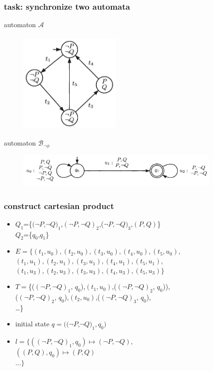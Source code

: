\documentclass{beamer}
\begin{document}
    \begin{frame}
        \frametitle{task: synchronize two automata}
        automaton $\mathcal{A}$\\
        \begin{figure}
            \centering
            \includegraphics[width=2.0in,height=2.0in]{3_2.jpg}
        \end{figure}
        automaton $\mathcal{B}_{\neg\phi}$
        \begin{figure}
            \centering
            \includegraphics[width=4.0in]{3_1.jpg}
        \end{figure}
    \end{frame}
    \begin{frame}
        \frametitle{construct cartesian product}
        \begin{itemize}
          \item $Q_1$=\{$(\neg P$,$\neg Q)_1$,$(\neg P, \neg Q)_2$,($\neg P, \neg Q)_3$,$(P,Q)$\}\\
                $Q_2$=\{$q_0$,$q_1$\}
          \item $E=\{(t_1,u_0),(t_2,u_0),(t_3,u_0),(t_4,u_0),(t_5,u_0),$\\
                \qquad $(t_1,u_1),(t_2,u_1),(t_3,u_1),(t_4,u_1),(t_5,u_1),$\\
                \qquad $(t_1,u_3),(t_2,u_3),(t_3,u_3),(t_4,u_3),(t_5,u_3)\}$
          \item $T=$\{($(\neg P, \neg Q)_1$, $q_0$),$(t_1,u_0)$,($(\neg P, \neg Q)_2$, $q_0$)),\\
                \qquad($(\neg P, \neg Q)_2$, $q_0$),$(t_2,u_0)$,($(\neg P, \neg Q)_3$, $q_0$),\\
                \qquad\dots\}
          \item initial state $q=((\neg P$,$\neg Q)_1,q_0)$
          \item
                  $l= \{((\neg P,\neg Q)_1,q_0)\mapsto(\neg P,\neg Q),$\\
                  \qquad$ ((P,Q),q_0)\mapsto (P,Q) $\\
                 \qquad$   \dots \}$
        \end{itemize}


    \end{frame}
\end{document}
